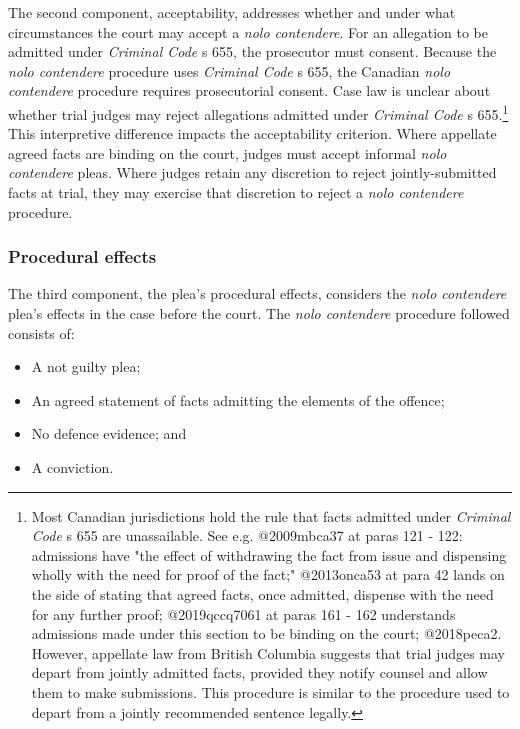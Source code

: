 The second component, acceptability, addresses whether and under what circumstances the court may accept a \textit{nolo contendere}. For an allegation to be admitted under \textit{Criminal Code} s 655, the prosecutor must consent. Because the \textit{nolo contendere} procedure uses \textit{Criminal Code} s 655, the Canadian \textit{nolo contendere} procedure requires prosecutorial consent. Case law is unclear about whether trial judges may reject allegations admitted under \textit{Criminal Code} s 655.\footnote{Most Canadian jurisdictions hold the rule that facts admitted under \textit{Criminal Code} s 655 are unassailable. See e.g. @2009mbca37 at paras 121 - 122: admissions have "the effect of withdrawing the fact from issue and dispensing wholly with the need for proof of the fact;" @2013onca53 at para 42 lands on the side of stating that agreed facts, once admitted, dispense with the need for any further proof; @2019qccq7061 at paras 161 - 162 understands admissions made under this section to be binding on the court; @2018peca2. However, appellate law from British Columbia suggests that trial judges may depart from jointly admitted facts, provided they notify counsel and allow them to make submissions. This procedure is similar to the procedure used to depart from a jointly recommended sentence legally.} This interpretive difference impacts the acceptability criterion. Where appellate agreed facts are binding on the court, judges must accept informal \textit{nolo contendere} pleas. Where judges retain any discretion to reject jointly-submitted facts at trial, they may exercise that discretion to reject a \textit{nolo contendere} procedure.

\subsubsection{Procedural effects}

The third component, the plea's procedural effects, considers the \textit{nolo contendere} plea's effects in the case before the court. The \textit{nolo contendere} procedure followed consists of:

\begin{itemize}
    \item A not guilty plea;
    \item An agreed statement of facts admitting the elements of the offence;
    \item No defence evidence; and
    \item A conviction.
\end{itemize}

